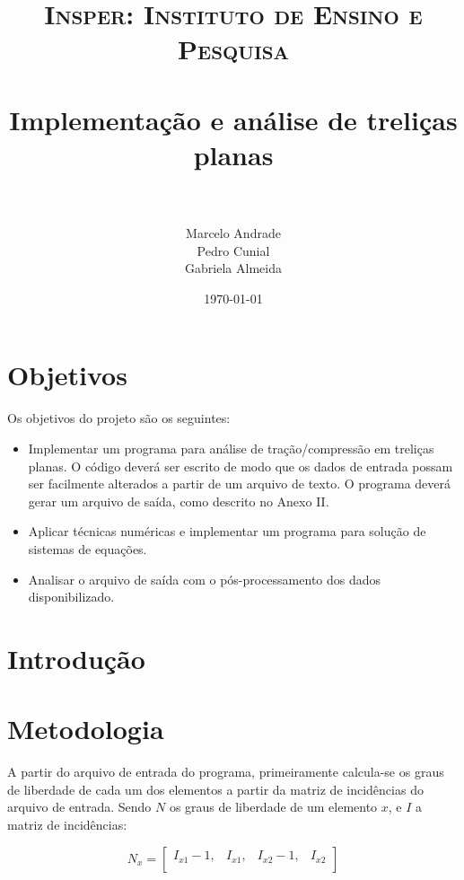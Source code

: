 \documentclass[paper=a4, fontsize=11pt]{scrartcl}
\title{
		\usefont{OT1}{bch}{b}{n}
		\normalfont \normalsize \textsc{Insper: Instituto de Ensino e Pesquisa} \\ [25pt] %
		\horrule{0.5pt} \\[0.4cm]														  
		\huge Implementação e análise de treliças planas \\			%
		\horrule{2pt} \\[0.5cm]
}
\author{										%
		\normalfont 								\normalsize
        Marcelo Andrade\\[-3pt]		\normalsize
		Pedro Cunial\\[-3pt]		\normalsize
        Gabriela Almeida\\[-3pt]		\normalsize
}
\date{\today}
\begin{document}
	
\maketitle

\newpage

\tableofcontents

\newpage


\section{Objetivos}
Os objetivos do projeto são os seguintes:

\begin{itemize}
	\item Implementar um programa para análise de tração/compressão em
	treliças planas. O código deverá ser escrito de modo que os dados de entrada
	possam ser facilmente alterados a partir de um arquivo de texto. O programa deverá gerar um arquivo de saída, como
	descrito no Anexo II. 
	
	\item Aplicar técnicas numéricas e implementar um programa para
	solução de sistemas de equações. 
	
	\item Analisar o arquivo de saída com o pós-processamento dos dados
	disponibilizado. 
\end{itemize}

\section{Introdução}

\section{Metodologia}

A partir do arquivo de entrada do programa, primeiramente calcula-se os graus de liberdade de cada um dos elementos a partir da matriz de incidências do arquivo de entrada. Sendo \(N\) os graus de liberdade de um elemento \(x\), e \(I\) a matriz de incidências:


\[N_x = 
\begin{bmatrix}
I_{x1} - 1 ,& I_{x1} ,& I_{x2} - 1 ,& I_{x2}  \\
\end{bmatrix}
\]
\end{document}

